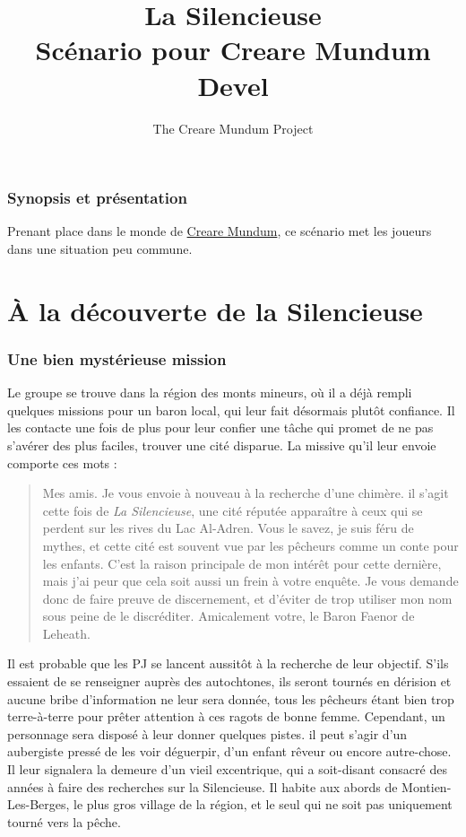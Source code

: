 \documentclass[a4paper]{article}
\title{La Silencieuse \\ Scénario pour Creare Mundum \\ Devel}
\author{The Creare Mundum Project}
\date{\oldstylenums{\insertdate}}
\begin{document}
\maketitle
\setcounter{tocdepth}{1} %
\renewcommand{\contentsname}{Sommaire} 
\tableofcontents
\newpage
\section{Synopsis et présentation}
Prenant place dans le monde de {\hyperlink {participation} {Creare Mundum}}, ce scénario met les joueurs dans une situation peu commune. 
\part{À la découverte de la Silencieuse}
\section{Une bien mystérieuse mission}
Le groupe se trouve dans la région des monts mineurs, où il a déjà rempli quelques missions pour un baron local, qui leur fait désormais plutôt confiance. Il les contacte une fois de plus pour leur confier une tâche qui promet de ne pas s'avérer des plus faciles, trouver une cité disparue. La missive qu'il leur envoie comporte ces mots :
\begin{quotation}
Mes amis. 
\newline
Je vous envoie à nouveau à la recherche d'une chimère. il s'agit cette fois de \textit{La Silencieuse}, une cité réputée apparaître à ceux qui se perdent sur les rives du Lac Al-Adren. Vous le savez, je suis féru de mythes, et cette cité est souvent vue par les pêcheurs comme un conte pour les enfants. C'est la raison principale de mon intérêt pour cette dernière, mais j'ai peur que cela soit aussi un frein à votre enquête. Je vous demande donc de faire preuve de discernement, et d'éviter de trop utiliser mon nom sous peine de le discréditer.
\newline
Amicalement votre, le Baron Faenor de Leheath.
\end{quotation}
Il est probable que les PJ se lancent aussitôt à la recherche de leur objectif. S'ils essaient de se renseigner auprès des autochtones, ils seront tournés en dérision et aucune bribe d'information ne leur sera donnée, tous les pêcheurs étant bien trop terre-à-terre pour prêter attention à ces ragots de bonne femme. Cependant, un personnage sera disposé à leur donner quelques pistes. il peut s'agir d'un aubergiste pressé de les voir déguerpir, d'un enfant rêveur ou encore autre-chose. Il leur signalera la demeure d'un vieil excentrique, qui a soit-disant consacré des années à faire des recherches sur la Silencieuse. Il habite aux abords de Montien-Les-Berges, le plus gros village de la région, et le seul qui ne soit pas uniquement tourné vers la pêche. 
\end{document}
